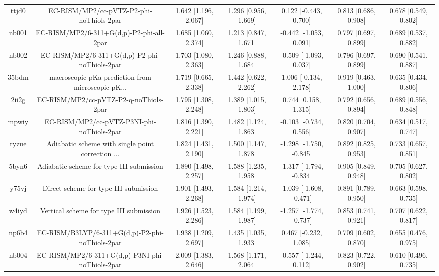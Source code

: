 \documentclass{article}
\begin{document}
\begin{center}
\begin{longtable}{|ccccccc|}
 ttjd0 &           EC-RISM/MP2/cc-pVTZ-P2-phi-noThiols-2par &  1.642 [1.196, 2.067] &  1.296 [0.956, 1.669] &    0.122 [-0.443, 0.700] &  0.813 [0.686, 0.908] &   0.678 [0.549, 0.802] \\
 nb001 &           EC-RISM/MP2/6-311+G(d,p)-P2-phi-all-2par &  1.685 [1.060, 2.374] &  1.213 [0.847, 1.671] &   -0.442 [-1.053, 0.091] &  0.797 [0.697, 0.899] &   0.689 [0.537, 0.882] \\
 nb002 &      EC-RISM/MP2/6-311+G(d,p)-P2-phi-noThiols-2par &  1.703 [1.080, 2.363] &  1.246 [0.888, 1.684] &   -0.509 [-1.093, 0.037] &  0.796 [0.697, 0.899] &   0.690 [0.541, 0.887] \\
 35bdm &  macroscopic pKa prediction from microscopic pK... &  1.719 [0.665, 2.338] &  1.442 [0.622, 2.262] &    1.006 [-0.134, 2.178] &  0.919 [0.463, 1.000] &   0.635 [0.434, 0.806] \\
 2ii2g &             EC-RISM/MP2/cc-pVTZ-P2-q-noThiols-2par &  1.795 [1.308, 2.248] &  1.389 [1.015, 1.803] &     0.744 [0.158, 1.315] &  0.792 [0.656, 0.894] &   0.689 [0.556, 0.848] \\
 mpwiy &         EC-RISM/MP2/cc-pVTZ-P3NI-phi-noThiols-2par &  1.816 [1.390, 2.221] &  1.482 [1.124, 1.863] &   -0.103 [-0.734, 0.556] &  0.820 [0.704, 0.907] &   0.634 [0.517, 0.747] \\
 ryzue &  Adiabatic scheme with single point correction ... &  1.824 [1.431, 2.190] &  1.500 [1.147, 1.878] &  -1.298 [-1.750, -0.845] &  0.892 [0.825, 0.953] &   0.733 [0.657, 0.851] \\
 5byn6 &           Adiabatic scheme for type III submission &  1.890 [1.498, 2.257] &  1.588 [1.235, 1.958] &  -1.317 [-1.794, -0.834] &  0.905 [0.849, 0.948] &   0.705 [0.627, 0.802] \\
 y75vj &              Direct scheme for type III submission &  1.901 [1.493, 2.268] &  1.584 [1.214, 1.974] &  -1.039 [-1.608, -0.471] &  0.891 [0.789, 0.950] &   0.663 [0.598, 0.735] \\
 w4iyd &            Vertical scheme for type III submission &  1.926 [1.523, 2.286] &  1.584 [1.199, 1.987] &  -1.257 [-1.774, -0.737] &  0.853 [0.741, 0.921] &   0.707 [0.622, 0.817] \\
 np6b4 &    EC-RISM/B3LYP/6-311+G(d,p)-P2-phi-noThiols-2par &  1.938 [1.209, 2.697] &  1.435 [1.035, 1.933] &    0.467 [-0.232, 1.085] &  0.709 [0.602, 0.870] &   0.655 [0.476, 0.975] \\
 nb004 &    EC-RISM/MP2/6-311+G(d,p)-P3NI-phi-noThiols-2par &  2.009 [1.383, 2.646] &  1.568 [1.171, 2.064] &   -0.557 [-1.244, 0.112] &  0.823 [0.722, 0.902] &   0.610 [0.496, 0.735] \\

\end{longtable}
\end{center}
\end{document}
